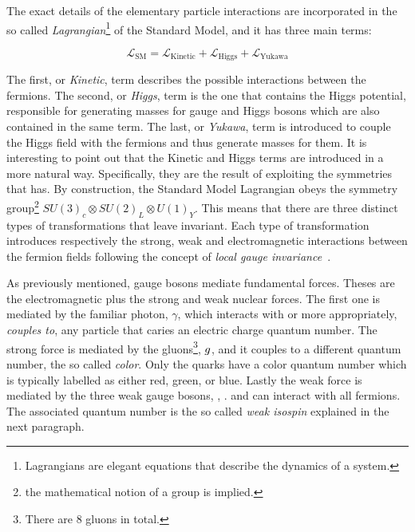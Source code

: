 The exact details of the elementary particle interactions are incorporated in the so called
{\it Lagrangian}\footnote{ Lagrangians are elegant equations that describe the dynamics of a system.} of the Standard Model,
and it has three main terms:

\begin{equation}
\mathscr{L}_{\text{SM}} =
\mathscr{L}_{\text{Kinetic}} + \mathscr{L}_{\text{Higgs}} + \mathscr{L}_{\text{Yukawa}}
\label{lagrangian}
\end{equation}

\noindent The first, or {\it Kinetic}, term describes the possible interactions between the fermions.
The second, or {\it Higgs}, term is the one that contains the Higgs potential, responsible for generating
masses for gauge and Higgs bosons which are also contained in the same term.
The last, or {\it Yukawa}, term is introduced to couple the Higgs field with the fermions and thus generate masses for them.
It is interesting to point out that the Kinetic and Higgs terms are introduced in a more natural way.
Specifically, they are the result of exploiting the symmetries that  has.
By construction, the Standard Model Lagrangian obeys the symmetry group\footnote{the mathematical notion of a group is implied.}
$SU(3)_c\otimes SU(2)_L\otimes U(1)_Y$. This means that there are three distinct types of transformations
that leave  invariant. Each type of transformation introduces respectively the strong,
weak and electromagnetic interactions between the fermion fields following the concept of {\it local gauge invariance}~\cite{aitchison,halzen1984quarks}.

As previously mentioned, gauge bosons mediate fundamental forces. Theses are the electromagnetic plus the strong and weak nuclear forces.
The first one is mediated by the familiar photon, $\gamma$, which interacts with or more appropriately, {\it couples to}, any particle that
caries an electric charge quantum number. The strong force is mediated by the gluons\footnote{There are 8 gluons in total.}, $g$,
and it couples to a different quantum number, the so called {\it color}.
Only the quarks have a color quantum number which is typically labelled as either red, green, or blue. Lastly the
weak force is mediated by the three weak gauge bosons, \Wpm, \Z. and can interact with all fermions. The associated quantum number is
the so called {\it weak isospin} explained in the next paragraph.


